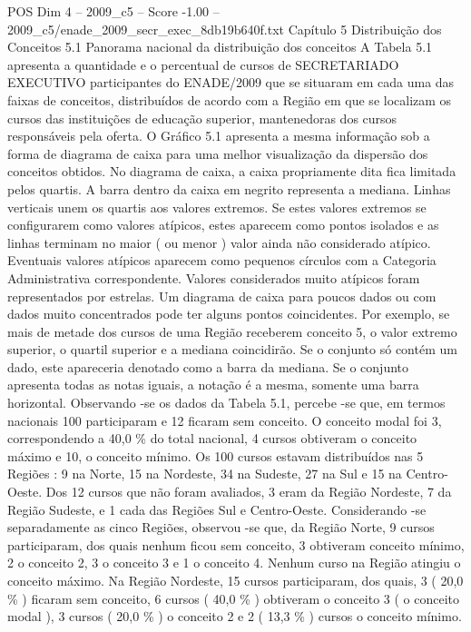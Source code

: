 \begin{textsample}{POS Dim 4 – 2009\_c5 – Score -1.00 – 2009\_c5/enade\_2009\_secr\_exec\_8db19b640f.txt}  \label{ex:f4_pos_264}
Capítulo 5 Distribuição dos Conceitos 5.1 Panorama nacional da distribuição dos conceitos A Tabela 5.1 apresenta a quantidade e o percentual de cursos de SECRETARIADO EXECUTIVO participantes do ENADE/2009 que se situaram em cada uma das faixas de conceitos, distribuídos de acordo com a Região em que se localizam os cursos das instituições de educação superior, mantenedoras dos cursos responsáveis pela oferta.
O Gráfico 5.1 apresenta a mesma informação sob a forma de diagrama de caixa para uma melhor visualização da dispersão dos conceitos obtidos.
No diagrama de caixa, a caixa propriamente dita fica limitada pelos quartis.
A barra dentro da caixa em negrito representa a mediana.
Linhas verticais unem os quartis aos valores extremos.
Se estes valores extremos se configurarem como valores atípicos, estes aparecem como pontos isolados e as linhas terminam no maior ( ou menor ) valor ainda não considerado atípico.
Eventuais valores atípicos aparecem como pequenos círculos com a Categoria Administrativa correspondente.
Valores considerados muito atípicos foram representados por estrelas.
Um diagrama de caixa para poucos dados ou com dados muito concentrados pode ter alguns pontos coincidentes.
Por exemplo, se mais de metade dos cursos de uma Região receberem conceito 5, o valor extremo superior, o quartil superior e a mediana coincidirão.
Se o conjunto só contém um dado, este apareceria denotado como a barra da mediana.
Se o conjunto apresenta todas as notas iguais, a notação é a mesma, somente uma barra horizontal.
Observando -se os dados da Tabela 5.1, percebe -se que, em termos nacionais 100 participaram e 12 ficaram sem conceito.
O conceito modal foi 3, correspondendo a 40,0 \% do total nacional, 4 cursos obtiveram o conceito máximo e 10, o conceito mínimo.
Os 100 cursos estavam distribuídos nas 5 Regiões : 9 na Norte, 15 na Nordeste, 34 na Sudeste, 27 na Sul e 15 na Centro-Oeste.
Dos 12 cursos que não foram avaliados, 3 eram da Região Nordeste, 7 da Região Sudeste, e 1 cada das Regiões Sul e Centro-Oeste.
Considerando -se separadamente as cinco Regiões, observou -se que, da Região Norte, 9 cursos participaram, dos quais nenhum ficou sem conceito, 3 obtiveram conceito mínimo, 2 o conceito 2, 3 o conceito 3 e 1 o conceito 4.
Nenhum curso na Região atingiu o conceito máximo.
Na Região Nordeste, 15 cursos participaram, dos quais, 3 ( 20,0 \% ) ficaram sem conceito, 6 cursos ( 40,0 \% ) obtiveram o conceito 3 ( o conceito modal ), 3 cursos ( 20,0 \% ) o conceito 2 e 2 ( 13,3 \% ) cursos o conceito mínimo.

\end{textsample}
